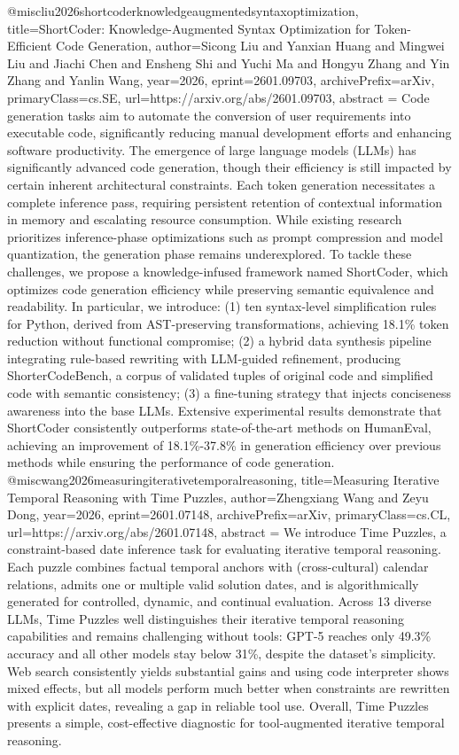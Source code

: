 {}@misc{liu2026shortcoderknowledgeaugmentedsyntaxoptimization,
      title={ShortCoder: Knowledge-Augmented Syntax Optimization for Token-Efficient Code Generation}, 
      author={Sicong Liu and Yanxian Huang and Mingwei Liu and Jiachi Chen and Ensheng Shi and Yuchi Ma and Hongyu Zhang and Yin Zhang and Yanlin Wang},
      year={2026},
      eprint={2601.09703},
      archivePrefix={arXiv},
      primaryClass={cs.SE},
      url={https://arxiv.org/abs/2601.09703},
      abstract = {Code generation tasks aim to automate the conversion of user requirements into executable code, significantly reducing manual development efforts and enhancing software productivity. The emergence of large language models (LLMs) has significantly advanced code generation, though their efficiency is still impacted by certain inherent architectural constraints. Each token generation necessitates a complete inference pass, requiring persistent retention of contextual information in memory and escalating resource consumption. While existing research prioritizes inference-phase optimizations such as prompt compression and model quantization, the generation phase remains underexplored. To tackle these challenges, we propose a knowledge-infused framework named ShortCoder, which optimizes code generation efficiency while preserving semantic equivalence and readability. In particular, we introduce: (1) ten syntax-level simplification rules for Python, derived from AST-preserving transformations, achieving 18.1\% token reduction without functional compromise; (2) a hybrid data synthesis pipeline integrating rule-based rewriting with LLM-guided refinement, producing ShorterCodeBench, a corpus of validated tuples of original code and simplified code with semantic consistency; (3) a fine-tuning strategy that injects conciseness awareness into the base LLMs. Extensive experimental results demonstrate that ShortCoder consistently outperforms state-of-the-art methods on HumanEval, achieving an improvement of 18.1\%-37.8\% in generation efficiency over previous methods while ensuring the performance of code generation.}
}@misc{wang2026measuringiterativetemporalreasoning,
      title={Measuring Iterative Temporal Reasoning with Time Puzzles}, 
      author={Zhengxiang Wang and Zeyu Dong},
      year={2026},
      eprint={2601.07148},
      archivePrefix={arXiv},
      primaryClass={cs.CL},
      url={https://arxiv.org/abs/2601.07148},
      abstract = {We introduce Time Puzzles, a constraint-based date inference task for evaluating iterative temporal reasoning. Each puzzle combines factual temporal anchors with (cross-cultural) calendar relations, admits one or multiple valid solution dates, and is algorithmically generated for controlled, dynamic, and continual evaluation. Across 13 diverse LLMs, Time Puzzles well distinguishes their iterative temporal reasoning capabilities and remains challenging without tools: GPT-5 reaches only 49.3\% accuracy and all other models stay below 31\%, despite the dataset's simplicity. Web search consistently yields substantial gains and using code interpreter shows mixed effects, but all models perform much better when constraints are rewritten with explicit dates, revealing a gap in reliable tool use. Overall, Time Puzzles presents a simple, cost-effective diagnostic for tool-augmented iterative temporal reasoning.}
}
